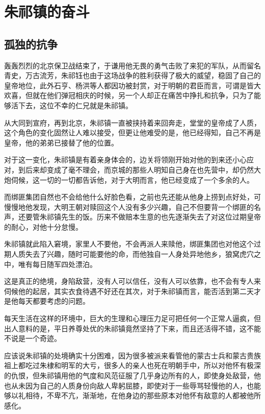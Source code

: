 \section{朱祁镇的奋斗}
\ifnum{}
	\begin{multicols}{\theparacolNo}
\fi
\subsection{孤独的抗争}
轰轰烈烈的北京保卫战结束了，于谦用他无畏的勇气击败了来犯的军队，从而留名青史，万古流芳，朱祁钰也由于这场战争的胜利获得了极大的威望，稳固了自己的皇帝地位，此外石亨、杨洪等人都因功被封赏，对于明朝的君臣而言，可谓是皆大欢喜，但就在他们弹冠相庆的时候，另一个人却正在痛苦中挣扎和抗争，只为了能够活下去，这位不幸的仁兄就是朱祁镇。

从大同到宣府，再到北京，朱祁镇一直被挟持着来回奔走，堂堂的皇帝成了人质，这个角色的变化固然让人难以接受，但更让他难受的是，他已经得知，自己不再是皇帝，他的弟弟已接替了他的位置。

对于这一变化，朱祁镇是有着亲身体会的，边关将领刚开始对他的到来还小心应对，到后来却变成了毫不理会，而京城的那些人明知自己身在也先营中，却仍然大炮伺候，这一切的一切都告诉他，对于大明而言，他已经变成了一个多余的人。

而绑匪集团自然也不会给他什么好脸色看，之前也先还能从他身上捞到点好处，可慢慢地他发现，大明王朝对赎回这个人没有多少兴趣，自己不但要背一个绑匪的名声，还要管朱祁镇先生的饭。历来不做赔本生意的也先逐渐失去了对这位过期皇帝的耐心，对他十分怠慢。

朱祁镇就此陷入窘境，家里人不要他，不会再派人来赎他，绑匪集团也对他这个过期人质失去了兴趣，随时可能要他的命，而他独自一人身处异地他乡，狼窝虎穴之中，唯有每日随军四处漂泊。

这是真正的绝境，身陷敌营，没有人可以信任，没有人可以依靠，也不会有专人来伺候他的起居，其实衣食待遇不好还在其次，对于朱祁镇而言，能否活到第二天才是他每天都要考虑的问题。

每天生活在这样的环境中，巨大的生理和心理压力足可把任何一个正常人逼疯，但出人意料的是，平日养尊处优的朱祁镇竟然坚持了下来，而且还活得不错，这不能不说是一个奇迹。

应该说朱祁镇的处境确实十分困难，因为很多被派来看管他的蒙古士兵和蒙古贵族祖上都吃过朱棣和明军的大亏，很多人的亲人也死在明朝手中，所以对他怀有极深的仇恨，但朱祁镇用他的气度和风范征服了几乎身边所有的人，即使身处敌营，他也从未因为自己的人质身份向敌人卑躬屈膝，即使对于一些辱骂轻慢他的人，也能够以礼相待，不卑不亢，渐渐地，在他身边的那些原本对他怀有敌意的人都被他所感化。


\end{multicols}
